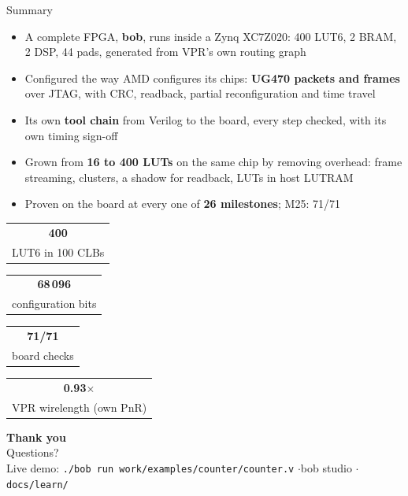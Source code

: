 \documentclass[aspectratio=169,11pt]{beamer}
\makeatletter
\newcommand{\kpi}[2]{\begin{tabular}{@{}c@{}}{\Large\bfseries\color{bobteal}#1}\\[-2pt]{\scriptsize\color{bobmute}#2}\end{tabular}}
\newcommand{\src}[1]{{\scriptsize\color{bobmute}#1}}
\makeatother
\begin{document}
\begin{frame}{Summary}
  \begin{itemize}
    \item A complete FPGA, \textbf{bob}, runs inside a Zynq XC7Z020: 400 LUT6, 2 BRAM, 2 DSP, 44 pads, generated from VPR's own routing graph
    \item Configured the way AMD configures its chips: \textbf{UG470 packets and frames} over JTAG, with CRC, readback, partial reconfiguration and time travel
    \item Its own \textbf{tool chain} from Verilog to the board, every step checked, with its own timing sign-off
    \item Grown from \textbf{16 to 400 LUTs} on the same chip by removing overhead: frame streaming, clusters, a shadow for readback, LUTs in host LUTRAM
    \item Proven on the board at every one of \textbf{26 milestones}; M25: 71/71
  \end{itemize}
  \vspace{4mm}
  \centering
  \kpi{400}{LUT6 in 100 CLBs}\qquad
  \kpi{68\,096}{configuration bits}\qquad
  \kpi{71/71}{board checks}\qquad
  \kpi{0.93$\times$}{VPR wirelength (own PnR)}
\end{frame}

\begin{frame}[plain]
  \centering
  \vspace{18mm}
  {\Huge\bfseries Thank you}\\[6mm]
  {\large Questions?}\\[12mm]
  \src{Live demo: \texttt{./bob run work/examples/counter/counter.v} \quad$\cdot$\quad bob studio \quad$\cdot$\quad \texttt{docs/learn/}}
\end{frame}
\end{document}
